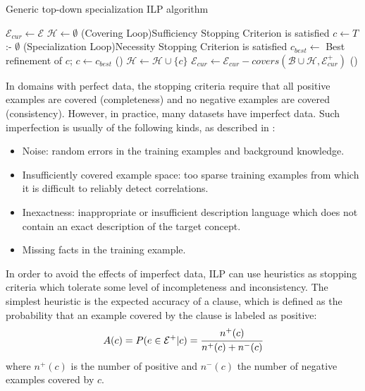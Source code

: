 \begin{algorithm}[!h]
  \caption{Generic top-down specialization ILP algorithm}
  \label{alg:topDownILP}

  $\mathcal{E}_{cur} \leftarrow \mathcal{E}$ \;
  $\mathcal{H} \leftarrow \emptyset$ \;
  \Repeat(Covering Loop){Sufficiency Stopping Criterion is satisfied} {
    $c \leftarrow T$ :- $\emptyset$ \;
    \Repeat(Specialization Loop){Necessity Stopping Criterion is satisfied} {
      $c_{best} \leftarrow$ Best refinement of $c$;
      $c \leftarrow c_{best}$ \;
    } ()
    $\mathcal{H} \leftarrow \mathcal{H} \cup \{c\}$ \;
    $\mathcal{E}_{cur} \leftarrow \mathcal{E}_{cur} - covers(\mathcal{B} \cup \mathcal{H},\mathcal{E}_{cur}^{+})$ \;
  } ()
\end{algorithm}

In domains with perfect data, the stopping criteria require that all positive examples are covered (completeness) and
no
negative examples are covered (consistency). However, in practice, many datasets have imperfect data. Such
imperfection is usually of the following kinds, as described in \cite{DBLP:conf/aii/LavracD92}:

\begin{itemize}
  \item Noise: random errors in the training examples and background knowledge.
  \item Insufficiently covered example space: too sparse training examples from which it is difficult to reliably
detect correlations.
  \item Inexactness: inappropriate or insufficient description language which does not contain an exact description of
the target concept.
  \item Missing facts in the training example.
\end{itemize}

In order to avoid the effects of imperfect data, ILP can use heuristics as stopping criteria which tolerate
some level of incompleteness and inconsistency. The simplest heuristic is the expected accuracy of a clause, which is
defined as the probability that an example
covered by the clause is labeled as positive:
\begin{equation}
A(c)=P(e \in \mathcal{E}^{+}|c)=\cfrac{n^{+}(c)}{n^{+}(c)+n^{-}(c)} 
\end{equation}
where $n^{+}(c)$ is the number of positive and $n^{-}(c)$ the number of negative examples covered by $c$. 

